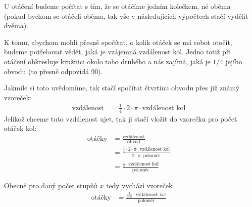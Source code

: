 \documentclass[../main.tex]{subfiles}
\begin{document}
	\begin{solution*}
		U otáčení budeme počítat s tím, že se otáčíme jedním kolečkem, né oběma (pokud bychom se otáčeli oběma, tak vše v následujících výpočtech stačí vydělit dvěma).

		K tomu, abychom mohli přesně spočítat, o kolik otáček se má robot otočit, budeme potřebovat vědět, jaká je vzájemná vzdálenost kol. Jedno totiž při otáčení obkresluje kružnici okolo toho druhého a nás zajímá, jaká je $1/4$ jejího obvodu (to přesně odpovídá 90\degree).

		Jakmile si toto uvědomíme, tak stačí spočítat čtvrtinu obvodu přes již známý vzoreček:
		$$
		\begin{aligned}
			\text{vzdálenost} &= \frac{1}{4} \cdot 2 \cdot \pi \cdot \text{vzdálenost kol}
		\end{aligned}
		$$
		Jelikož chceme tuto vzdálenost ujet, tak ji stačí vložit do vzorečku pro počet otáček kol:
		$$
		\begin{aligned}
			\text{otáčky} &= \frac{\text{vzdálenost}}{\text{obvod}} \\
			&= \frac{\frac{1}{4} \cdot 2 \cdot \pi \cdot \text{vzdálenost kol}}{2 \cdot \pi \cdot \text{poloměr}}  \\
			&= \frac{\frac{1}{4} \cdot \text{vzdálenost kol}}{\text{poloměr}}
		\end{aligned}
		$$

		Obecně pro daný počet stupňů $x$ tedy vychází vzoreček
		$$
		\begin{aligned}
			\text{otáčky} &= \frac{\frac{x}{360} \cdot \text{vzdálenost kol}}{\text{poloměr}}
		\end{aligned}
		$$
	\end{solution*}
\end{document}
